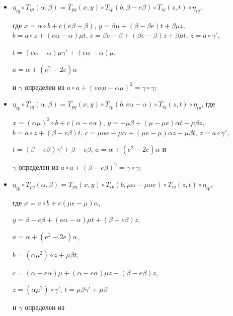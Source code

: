 \begin{itemize} 


\item[a)] $\eta_{iq}\circ T_{ip}(\alpha,\beta)=T_{pq}(x,y)\circ 


T_{ip}(b,\beta-e \beta)\circ T_{iq}(z,t)\circ\eta_{iq}$, 


где $x=\alpha\circ b+c(e \beta-\beta)$, $y=\beta\mu+(\beta-\beta 


e)t+\beta\mu z$, $b=a\circ z+(e\alpha-\alpha)\mu t$, $c=\beta 


e-\beta+(\beta e-\beta)z+\beta\mu t$, $z=a\circ\gamma'$, 


$t=(e\alpha-\alpha)\mu\gamma'+(e\alpha-\alpha)\mu$, 


$a=\alpha+(e^2-2e)\alpha$ 


и $\gamma$ определен из $a\circ 


a+(e\alpha\mu-\alpha\mu)^2=\gamma\circ\gamma$; 


\item[b)] $\eta_{ip}\circ T_{iq}(\alpha,\beta)=T_{pq}(x,y)\circ 


T_{ip}(b,e\alpha-\alpha)\circ T_{iq}(z,t)\circ\eta_{ip}$, где 


$x=(\alpha\mu)^2\circ b+c(\alpha-e\alpha)$, $y=-\mu\beta+(\mu-\mu 


e)\alpha t-\mu\beta z$, $b=a\circ z+(\beta-e\beta)t$, $c=\mu\alpha 


e-\mu\alpha+(\mu e-\mu)\alpha z-\mu\beta t$, $z=a\circ\gamma'$, 


$t=(\beta-e\beta)\gamma'+\beta-e\beta$, $a=\alpha+(e^2-2e)\alpha$ и 


$\gamma$ определен из $a\circ a+(\beta-e\beta)^2=\gamma\circ\gamma$; 


\item[c)] $\eta_{ip}\circ T_{pq}(\alpha,\beta)=T_{pq}(x,y)\circ 


T_{ip}(b,\mu\alpha-\mu\alpha e)\circ T_{iq}(z,t)\circ\eta_{ip}$, 


где $x=a\circ b+c(\mu e-\mu)\alpha$, 


$y=\beta-e\beta+(e\alpha-\alpha)\mu t+(\beta-e\beta)z$,


$a=\alpha+(e^2-2e)\alpha$, 


$b=(\alpha\mu^2)\circ z+\mu\beta t$, 


$c=(\alpha-e\alpha)\mu+(\alpha-e\alpha)\mu z+(\beta-e\beta)z$, 


$z=(\alpha\mu^2)\circ\gamma'$, $t=\mu\beta\gamma'+\mu\beta$ 


и $\gamma$ определен из 



\end{itemize}
